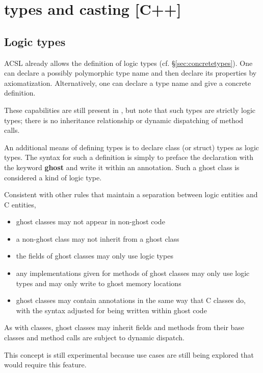 \section{\lang types and casting [C++]}
\label{sec:types}

\subsection{Logic types}

ACSL already allows the definition of logic types (cf. \S\ref{sec:concretetypes}). One can declare a possibly polymorphic type name and then declare its properties by axiomatization. Alternatively, one can declare 
a type name and give a concrete definition.

These capabilities are still present in \NAME, but note that such types are strictly logic types; there is no inheritance relationship or dynamic dispatching of method calls.

\experimental

An additional means of defining types is to declare
\lang class (or struct) types as logic types. The syntax for such a definition is simply to preface the declaration
with the keyword \textbf{ghost} and write it within an \NAME annotation. Such a ghost class is considered a kind of logic type.

Consistent with other rules that maintain a separation between logic entities and C entities,
\begin{itemize}
	\item ghost classes may not appear in non-ghost code
	\item a non-ghost class may not inherit from a ghost class
	\item the fields of ghost classes may only use logic types
	\item any implementations given for methods of ghost classes may only use logic types and may only write to ghost memory locations
	\item ghost classes may contain \NAME annotations in the same way that C classes do, with the syntax adjusted for being written within ghost code
\end{itemize}

As with \lang classes, ghost classes may inherit fields and methods from their base classes and method calls are subject to dynamic dispatch.

This concept is still experimental because use cases are still being explored that would require this feature.

